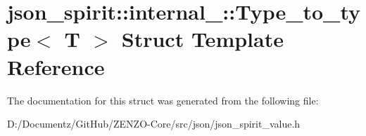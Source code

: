 \hypertarget{structjson__spirit_1_1internal___1_1_type__to__type}{}\section{json\+\_\+spirit\+::internal\+\_\+\+::Type\+\_\+to\+\_\+type$<$ T $>$ Struct Template Reference}
\label{structjson__spirit_1_1internal___1_1_type__to__type}


The documentation for this struct was generated from the following file\+:\begin{DoxyCompactItemize}
\item 
D\+:/\+Documentz/\+Git\+Hub/\+Z\+E\+N\+Z\+O-\/\+Core/src/json/json\+\_\+spirit\+\_\+value.\+h\end{DoxyCompactItemize}
